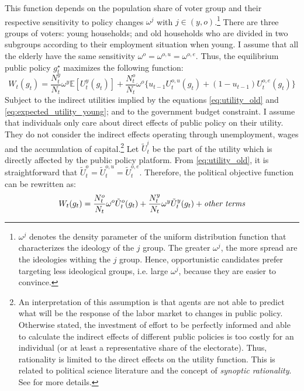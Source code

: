 This function depends on the population share of voter group and their respective sensitivity to policy changes $\omega^j$ with $j \in \left(y,o\right)$.\footnote{$\omega^j$ denotes the density parameter of the uniform distribution function that characterizes the ideology of the $j$ group. The greater $\omega^j$, the more spread are the ideologies withing the $j$ group. Hence, opportunistic candidates prefer targeting less ideological groups, i.e. large $\omega^j$, because they are easier to convince.} There are three groups of voters: young households; and old households who are divided in two subgroups according to their employment situation when young. I assume that all the elderly have the same sensitivity $\omega^o = \omega^{o,u} = \omega^{o,e}$. Thus, the equilibrium public policy $g_t^\star$ maximizes the following function:
	\begin{equation*}
		W_t(g_t) = \frac{N_t^y}{N_t} \omega^y \mathbb{E}\left[U_t^y(g_t)\right] + \frac{N_t^o}{N_t} \omega^o \Big\{ u_{t-1} U_t^{o,u}(g_t) + (1-u_{t-1}) U_t^{o,e}(g_t) \Big\}
	\end{equation*}
Subject to the indirect utilities implied by the equations \eqref{eq:utility_old} and \eqref{eq:expected_utility_young}; and to the government budget constraint.
I assume that individuals only care about direct effects of public policy on their utility. They do not consider the indirect effects operating through unemployment, wages and the accumulation of capital.\footnote{An interpretation of this assumption is that agents are not able to predict what will be the response of the labor market to changes in public policy. Otherwise stated, the investment of effort to be perfectly informed and able to calculate the indirect effects of different public policies is too costly for an individual (or at least a representative share of the electorate). Thus, rationality is limited to the direct effects on the utility function. This is related to political science literature and the concept of \textit{synoptic rationality}. See \cite{Meier1980} for more details.} Let $\tilde{U}^i_t$ be the part of the utility which is directly affected by the public policy platform. From \eqref{eq:utility_old}, it is straightforward that $\tilde{U}_t^o = \tilde{U}_t^{o,u} = \tilde{U}_t^{o,e}$. Therefore, the political objective function can be rewritten as:
	\begin{equation*}
		W_t(g_t) = \frac{N_t^o}{N_t} \omega^o \tilde{U}_t^o(g_t) + \frac{N_t^y}{N_t} \omega^y \tilde{U}_t^y(g_t) + \text{\textit{other~terms}}
	\end{equation*}
